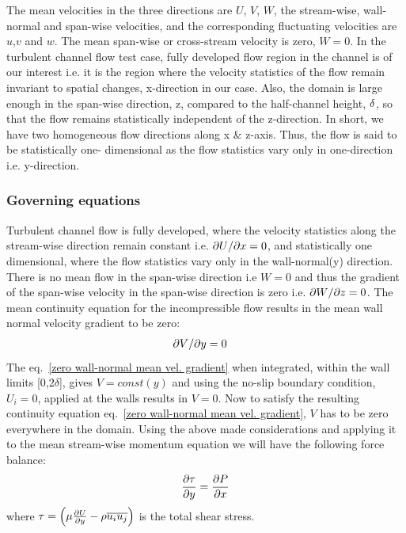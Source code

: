 The mean velocities in the three directions are $U$, $V$, $W$, the stream-wise, wall-normal and span-wise velocities, and the corresponding fluctuating velocities are $u$,$v$ and $w$. The mean span-wise or cross-stream velocity is zero, $W = 0$. 
In the turbulent channel flow test case, fully developed flow region in the channel is of our interest i.e. it is the region where the velocity statistics of the flow remain invariant to spatial changes, x-direction in our case. Also, the domain is large enough in the span-wise direction, z, compared to the half-channel height, $\delta$, so that the flow remains statistically independent of the z-direction. In short, we have two homogeneous flow directions along x \& z-axis. Thus, the flow is said to be statistically one- dimensional as the flow statistics vary only in one-direction i.e. y-direction. 


\subsubsection{Governing equations}

Turbulent channel flow is fully developed, where the velocity statistics along the stream-wise direction remain constant i.e. ${\partial U}/{\partial x}=0 $, and statistically one dimensional, where the flow statistics vary only in the wall-normal(y) direction. There is no mean flow in the span-wise direction i.e $W=0$ and thus the gradient of the span-wise velocity in the span-wise direction is zero i.e. ${\partial W}/{\partial z}=0 $. The mean continuity equation for the incompressible flow results in the mean wall normal velocity gradient to be zero:
\begin{equation}
\label{zero wall-normal mean vel. gradient}
\begin{split}
{\partial V}/{\partial y}&=0
\end{split}
\end{equation}
The eq.~\ref{zero wall-normal mean vel. gradient} when integrated, within the wall limits [0,$2\delta$], gives $V=const(y)$ and using the no-slip boundary condition, $U_i = 0$, applied at the walls results in $V = 0$. Now to satisfy the resulting continuity equation eq.~\ref{zero wall-normal mean vel. gradient}, $V$ has to be zero everywhere in the domain. Using the above made considerations and applying it to the mean stream-wise momentum equation we will have the following force balance:
\begin{equation}
\label{Forces channel flow}
\frac{\partial \tau}{\partial y} = \frac{\partial P}{\partial x}\\
\end{equation}
where $\tau = \left(\mu \frac{\partial U}{\partial y} - \rho\overline{u_iu_j}\right)$ is the total shear stress.\\

